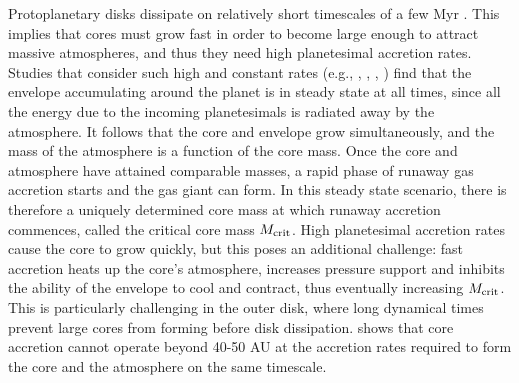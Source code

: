 Protoplanetary disks dissipate on relatively short timescales of a few Myr \citep{williams11}. This implies that cores must grow fast in order to become large enough to attract massive atmospheres, and thus they need high planetesimal accretion rates. Studies that consider such high and constant rates (e.g., \citealt{stevenson82}, \citealt{boden86}, \citealt{wuchterl93}, \citealt{rafikov06}) find that the envelope accumulating around the planet is in steady state at all times, since all the energy due to the incoming planetesimals is radiated away by the atmosphere. It follows that the core and envelope grow simultaneously, and the mass of the atmosphere is a function of the core mass. Once the core and atmosphere have attained comparable masses, a rapid phase of runaway gas accretion starts and the gas giant can form. In this steady state scenario, there is therefore a uniquely determined core mass at which runaway accretion commences, called the critical core mass $M_{\rm crit}$. High planetesimal accretion rates cause the core to grow quickly, but this poses an additional challenge: fast accretion heats up the core's atmosphere, increases pressure support and inhibits the ability of the envelope to cool and contract, thus eventually increasing $M_{\rm crit}$. This is particularly challenging in the outer disk, where long dynamical times prevent large cores from forming before disk dissipation. \citet{rafikov11} shows that core accretion cannot operate beyond 40-50 AU at the accretion rates required to form the core and the atmosphere on the same timescale. 


